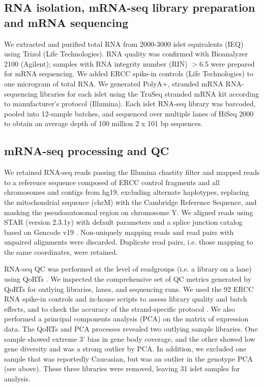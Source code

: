\subsection{RNA isolation, mRNA-seq library preparation and mRNA sequencing} 
We extracted and purified total RNA from 2000-3000 islet equivalents (IEQ) using Trizol (Life Technologies). RNA quality was confirmed with Bioanalyzer 2100 (Agilent); samples with RNA integrity number (RIN) $>$6.5 were prepared for mRNA sequencing. We added \ac{ERCC} spike-in controls (Life Technologies) to one microgram of total RNA.  We generated PolyA+, stranded mRNA RNA-sequencing libraries for each islet using the TruSeq stranded mRNA kit according to manufacturer’s protocol (Illumina).  Each islet RNA-seq library was barcoded, pooled into 12-sample batches, and sequenced over multiple lanes of HiSeq 2000 to obtain an average depth of 100 million 2 x 101 bp sequences.

\subsection{mRNA-seq processing and QC}
We retained RNA-seq reads passing the Illumina chastity filter and mapped reads to a reference sequence composed of \ac{ERCC} control fragments and all chromosomes and contigs from hg19, excluding alternate haplotypes, replacing the mitochondrial sequence (chrM) with the Cambridge Reference Sequence, and masking the pseudoautosomal region on chromosome Y. We aligned reads using STAR (version 2.3.1y) \cite{dobinSTARUltrafastUniversal2013a} with default parameters and a splice junction catalog based on Gencode v19 \cite{harrowGENCODEReferenceHuman2012}. Non-uniquely mapping reads and read pairs with unpaired alignments were discarded. Duplicate read pairs, i.e. those mapping to the same coordinates, were retained. 

RNA-seq QC was performed at the level of readgroups (i.e. a library on a lane) using QoRTs \cite{hartleyQoRTsComprehensiveToolset2015a}. We inspected the comprehensive set of QC metrics generated by QoRTs for outlying libraries, lanes, and sequencing runs. We used the 92 ERCC RNA spike-in controls and in-house scripts to assess library quality and batch effects, and to check the accuracy of the strand-specific protocol \cite{jiangSyntheticSpikeinStandards2011}. We also performed a principal components analysis (PCA) on the matrix of expression data. The QoRTs and PCA processes revealed two outlying sample libraries.  One sample showed extreme 3’ bias in gene body coverage, and the other showed low gene diversity and was a strong outlier by PCA. In addition, we excluded one sample that was reportedly Caucasian, but was an outlier in the genotype PCA (see above). These three libraries were removed, leaving 31 islet samples for analysis.

